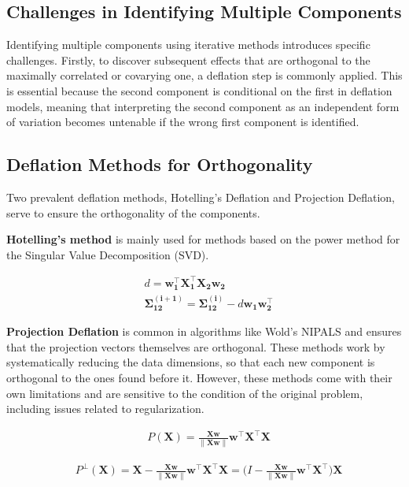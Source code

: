 \subsection{Challenges in Identifying Multiple Components}

Identifying multiple components using iterative methods introduces specific challenges.
Firstly, to discover subsequent effects that are orthogonal to the maximally correlated or covarying one, a deflation step is commonly applied.
This is essential because the second component is conditional on the first in deflation models, meaning that interpreting the second component as an independent form of variation becomes untenable if the wrong first component is identified.

\subsection{Deflation Methods for Orthogonality}

Two prevalent deflation methods, Hotelling's Deflation and Projection Deflation, serve to ensure the orthogonality of the components.

\textbf{Hotelling's method}  is mainly used for methods based on the power method for the Singular Value
Decomposition (SVD).

\begin{align}
     & d = \mathbf{w^{\top}_1X^{\top}_1X_2w_2}                                            \\
     & \mathbf{\Sigma^{(i+1)}_{12}}= \mathbf{\Sigma^{(i)}_{12}} - d\mathbf{w_1w^{\top}_2}
\end{align}

\textbf{Projection Deflation} is common in algorithms like Wold's NIPALS and ensures that the projection vectors
themselves are orthogonal. These methods work by systematically reducing the data dimensions, so that each new component is orthogonal to the ones found before it. However, these methods come with their own limitations and are sensitive to the condition of the original problem, including issues related to regularization.

\begin{align}
     & P(\mathbf{X})= \frac{\mathbf{Xw}}{\|\mathbf{Xw}\|}\mathbf{w^{\top}X^{\top}X}
\end{align}

\begin{align}
     & P^\perp(\mathbf{X})= \mathbf{X} - \frac{\mathbf{Xw}}{\|\mathbf{Xw}\|}\mathbf{w^{\top}X^{\top}X} = (I - \frac{\mathbf{Xw}}{\|\mathbf{Xw}\|}\mathbf{w^{\top}X^{\top})X}
\end{align}

